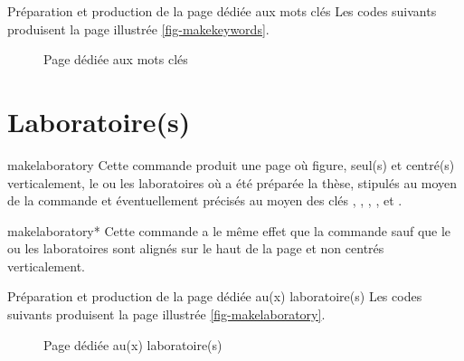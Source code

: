 \begin{dbexample}{Préparation et production de la page dédiée aux mots clés}{}
  Les codes suivants produisent la page illustrée \vref{fig-makekeywords}.
%
\end{dbexample}

\begin{figure}[htbp]
  \centering
  \caption{Page dédiée aux mots clés}
  \label{fig-makekeywords}
\end{figure}

\section{Laboratoire(s)}
\label{sec-laboratoires}

\begin{docCommand}{makelaboratory}{}
  Cette commande produit une page où figure, seul(s) et centré(s)
  verticalement, le ou les laboratoires où a été préparée la thèse, stipulés au
  moyen de la commande  et éventuellement précisés au moyen
  des clés , , ,
  ,  et .
\end{docCommand}
%
\begin{docCommand}{makelaboratory*}{}
  Cette commande a le même effet que la commande  sauf
  que le ou les laboratoires sont alignés sur le haut de la page et non centrés
  verticalement.
\end{docCommand}

\begin{dbexample}{Préparation et production de la page dédiée au(x) laboratoire(s)}{}
  Les codes suivants produisent la page illustrée \vref{fig-makelaboratory}.
  \NoAutoSpacing%
%
\end{dbexample}

\begin{figure}[htbp]
  \centering
  \caption{Page dédiée au(x) laboratoire(s)}
  \label{fig-makelaboratory}
\end{figure}

